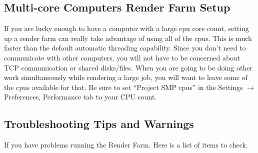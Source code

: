 \subsection{Multi-core Computers Render Farm Setup}%
\label{sub:multi_core_render_farm_setup}

If you are lucky enough to have a computer with a large cpu core
count, setting up a render farm can really take advantage of using
all of the cpus. This is much faster than the default automatic
threading capability. Since you don’t need to communicate with other
computers, you will not have to be concerned about TCP communication
or shared disks/files. When you are going to be doing other work
simultaneously while rendering a large job, you will want to leave
some of the cpus available for that.  Be sure to set “Project SMP
cpus” in the Settings $\rightarrow$ Preferences, Performance tab to your CPU
count.

\subsection{Troubleshooting Tips and Warnings}%
\label{sub:troubleshhoting_tips_warnings}

\noindent If you have problems running the Render Farm.  Here is a
list of items to check.

